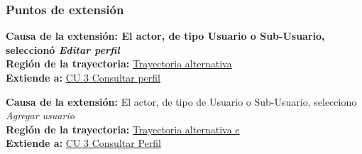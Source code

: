\subsubsection{Puntos de extensión}
\noindent \textbf{Causa de la extensión: El actor, de tipo Usuario o Sub-Usuario, seleccionó \textit{Editar perfil}} \\
\textbf{Región de la trayectoria:} \hyperref[cu3_2_ta_]{Trayectoria alternativa } \\
\textbf{Extiende a:} \hyperref[cu3]{CU 3 Consultar perfil}

\noindent \textbf{Causa de la extensión:} El actor, de tipo de Usuario o Sub-Usuario, selecciono \textit{Agregar usuario} \\
\textbf{Región de la trayectoria:} \hyperref[cu3_2_ta_e]{Trayectoria alternativa e} \\
\textbf{Extiende a:} \hyperref[cu3]{CU 3 Consultar Perfil}
